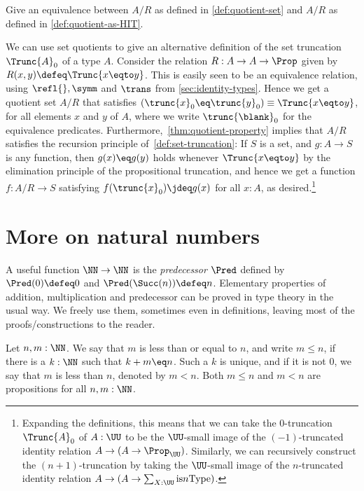 \begin{xca}\label{xca:quotients-equivalence}
Give an equivalence between $A/R$ as defined in \cref{def:quotient-set}
and $A/R$ as defined in \cref{def:quotient-as-HIT}.
\end{xca}

\begin{remark}\label{rem:set-trunc-as-quotient}
We can use set quotients to give an alternative definition
of the set truncation $\Trunc{A}_0$ of a type $A$.
Consider the relation $R : A \to A \to \Prop$ given by
$R(x,y) \defeq \Trunc {x \eqto y}$.
This is easily seen to be an equivalence relation,
using $\refl{},\symm$ and $\trans$ from \cref{sec:identity-types}.
Hence we get a quotient set $A/R$ that satisfies
$(\trunc{x}_0 \eq \trunc{y}_0) \equiv \Trunc{x\eqto y}$,
for all elements $x$ and $y$ of $A$,
where we write $\trunc{\blank}_0$ for the equivalence predicates.
Furthermore,~\cref{thm:quotient-property} implies that
$A/R$ satisfies the recursion principle of~\cref{def:set-truncation}:
If $S$ is a set, and $g:A\to S$ is any function,
then $g(x) \eq g(y)$ holds whenever $\Trunc{x\eqto y}$
by the elimination principle
of the propositional truncation,
and hence we get a function $f : A/R \to S$ satisfying
$f(\trunc{x}_0)\jdeq g(x)$ for all $x:A$, as desired.\footnote{%
  Expanding the definitions,
  this means that we can take the $0$-truncation $\Trunc{A}_0$
  of $A:\UU$ to be the $\UU$-small image
  of the $(-1)$-truncated identity relation
  $A \to (A \to \Prop_\UU)$.
  Similarly, we can recursively construct the $(n+1)$-truncation
  by taking the $\UU$-small image
  of the $n$-truncated identity relation
  $A \to (A \to \sum_{X:\UU}\mathrm{is}{n}\mathrm{Type})$.}
\end{remark}

\section{More on natural numbers}
\label{sec:more-on-N}

A useful function $\NN\to\NN$ is the \emph{predecessor} $\Pred$ defined by
$\Pred(0)\defeq 0$ and $\Pred(\Succ(n))\defeq n$.
Elementary properties of addition, multiplication and predecessor
can be proved in type theory in the usual way.
We freely use them, sometimes even in definitions, leaving most of the
proofs/constructions to the reader.

\begin{definition}
\label{def:orderonN}
Let $n,m:\NN$. We say that $m$ is less than or equal to $n$, and write $m\leq n$,
if there is a $k:\NN$ such that $k+m \eq n$. Such a $k$ is unique, and if it
is not $0$, we say that $m$ is less than $n$, denoted by $m<n$.
Both $m\leq n$ and $m<n$ are propositions for all $n,m:\NN$.
\end{definition}

